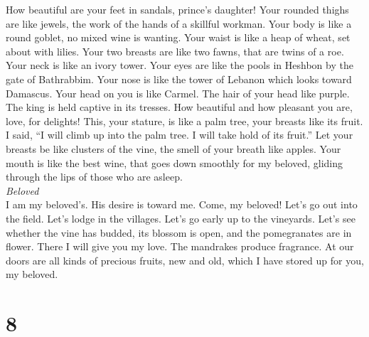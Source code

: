  How beautiful are your feet in sandals, prince's
daughter! Your rounded thighs are like jewels, the work of the hands of
a skillful workman.  Your body is like a round goblet, no
mixed wine is wanting. Your waist is like a heap of wheat, set about
with lilies.  Your two breasts are like two fawns, that
are twins of a roe.  Your neck is like an ivory tower.
Your eyes are like the pools in Heshbon by the gate of Bathrabbim. Your
nose is like the tower of Lebanon which looks toward Damascus.
 Your head on you is like Carmel. The hair of your head
like purple. The king is held captive in its tresses.  How
beautiful and how pleasant you are, love, for delights! 
This, your stature, is like a palm tree, your breasts like its fruit.
 I said, ``I will climb up into the palm tree. I will take
hold of its fruit.'' Let your breasts be like clusters of the vine, the
smell of your breath like apples.  Your mouth is like the
best wine, that goes down smoothly for my beloved, gliding through the
lips of those who are asleep.\\
\emph{Beloved}\\
 I am my beloved's. His desire is toward me.
 Come, my beloved! Let's go out into the field. Let's
lodge in the villages.  Let's go early up to the
vineyards. Let's see whether the vine has budded, its blossom is open,
and the pomegranates are in flower. There I will give you my love.
 The mandrakes produce fragrance. At our doors are all
kinds of precious fruits, new and old, which I have stored up for you,
my beloved.

\hypertarget{section-7}{%
\section{8}\label{section-7}}

